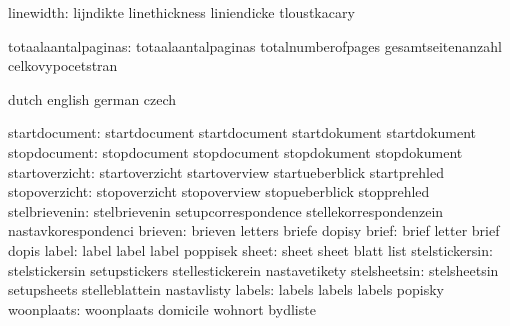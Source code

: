                     linewidth:  lijndikte                    linethickness
                                liniendicke                  tloustkacary

          totaalaantalpaginas:  totaalaantalpaginas          totalnumberofpages
                                gesamtseitenanzahl           celkovypocetstran

\stopcommands




\startcommands                  dutch                        english
                                german                       czech

                startdocument:  startdocument                startdocument
                                startdokument                startdokument
                 stopdocument:  stopdocument                 stopdocument
                                stopdokument                 stopdokument
               startoverzicht:  startoverzicht               startoverview
                                startueberblick              startprehled
                stopoverzicht:  stopoverzicht                stopoverview
                                stopueberblick               stopprehled
                stelbrievenin:  stelbrievenin                setupcorrespondence
                                stellekorrespondenzein       nastavkorespondenci
                      brieven:  brieven                      letters
                                briefe                       dopisy
                        brief:  brief                        letter
                                brief                        dopis
                        label:  label                        label
                                label                        poppisek
                        sheet:  sheet                        sheet
                                blatt                        list
               stelstickersin:  stelstickersin               setupstickers
                                stellestickerein             nastavetikety
                 stelsheetsin:  stelsheetsin                 setupsheets
                                stelleblattein               nastavlisty
                       labels:  labels                       labels
                                labels                       popisky
                   woonplaats:  woonplaats                   domicile
                                wohnort                      bydliste

\stopcommands


\stoplogginginterface

\endinput

